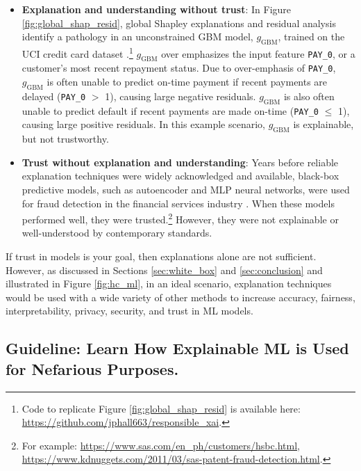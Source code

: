 \documentclass[fleqn]{article}
\begin{document}
\begin{itemize}

\item \textbf{Explanation and understanding without trust}: In Figure \ref{fig:global_shap_resid}, global Shapley explanations and residual analysis identify a pathology in an unconstrained GBM model, $g_{\text{GBM}}$, trained on the UCI credit card dataset \cite{uci}.\footnote{Code to replicate Figure \ref{fig:global_shap_resid} is available here: \url{https://github.com/jphall663/responsible_xai}.} $g_{\text{GBM}}$ over emphasizes the input feature \texttt{PAY\_0}, or a customer's most recent repayment status. Due to over-emphasis of \texttt{PAY\_0}, $g_{\text{GBM}}$ is often unable to predict on-time payment if recent payments are delayed (\texttt{PAY\_0} $>$ 1), causing large negative residuals. $g_{\text{GBM}}$ is also often unable to predict default if recent payments are made on-time (\texttt{PAY\_0} $\leq$ 1), causing large positive residuals. In this example scenario, $g_{\text{GBM}}$ is explainable, but not trustworthy. 

\item \textbf{Trust without explanation and understanding}: Years before reliable explanation techniques were widely acknowledged and available, black-box predictive models, such as autoencoder and MLP neural networks, were used for fraud detection in the financial services industry \cite{gopinathan1998fraud}. When these models performed well, they were trusted.\footnote{For example: \url{https://www.sas.com/en_ph/customers/hsbc.html}, \url{https://www.kdnuggets.com/2011/03/sas-patent-fraud-detection.html}.} However, they were not explainable or well-understood by contemporary standards.  

\end{itemize}

If trust in models is your goal, then explanations alone are not sufficient. However, as discussed in Sections \ref{sec:white_box} and \ref{sec:conclusion} and illustrated in Figure \ref{fig:hc_ml}, in an ideal scenario, explanation techniques would be used with a wide variety of other methods to increase accuracy, fairness, interpretability, privacy, security, and trust in ML models. 

\subsection{Guideline: Learn How Explainable ML is Used for Nefarious Purposes.}
\end{document}
